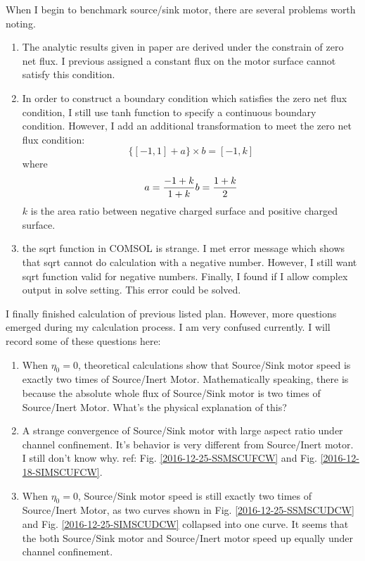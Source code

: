 \documentclass[fontsize=11pt, %
                             paper=a4, %
                             twoside, %
                             captions=tableheading,
                             index=totoc,
                             hyperref]{labbook}
\begin{document}
\begin{addmargin}[4cm]{0cm}
When I begin to benchmark source/sink motor, there are several problems worth noting.
\begin{enumerate}
\item
The analytic results given in paper\cite{Nourhani2016} are derived under the constrain of zero net flux. I previous assigned a constant flux on the motor surface cannot satisfy this condition.
\item
In order to construct a boundary condition which satisfies the zero net flux condition, I still use tanh function to specify a continuous boundary condition. However, I add an additional transformation to meet the zero net flux condition:
\begin{equation}
\{[-1,1]+a\}\times b=[-1,k]
\end{equation}
where
\begin{equation}
a=\frac{-1+k}{1+k}\\
b=\frac{1+k}{2}
\end{equation}
$k$ is the area ratio between negative charged surface and positive charged surface.
\item
the sqrt function in COMSOL is strange. I met error message which shows that sqrt cannot do calculation with a negative number. However, I still want sqrt function valid for negative numbers. Finally, I found if I allow complex output in solve setting. This error could be solved.
\end{enumerate}
I finally finished calculation of previous listed plan. However, more questions emerged during my calculation process. I am very confused currently. I will record some of these questions here:
\begin{enumerate}
\item
When $\eta_0=0$, theoretical calculations show that Source/Sink motor speed is exactly two times of Source/Inert Motor. Mathematically speaking, there is because the absolute whole flux of Source/Sink motor is two times of Source/Inert Motor. What's the physical explanation of this?
\item
A strange convergence of Source/Sink motor with large aspect ratio under channel confinement. It's behavior is very different from Source/Inert motor. I still don't know why. ref: Fig. \ref{2016-12-25-SSMSCUFCW} and Fig. \ref{2016-12-18-SIMSCUFCW}.
\item
When $\eta_0=0$, Source/Sink motor speed is still exactly two times of Source/Inert Motor, as two curves shown in Fig. \ref{2016-12-25-SSMSCUDCW} and Fig. \ref{2016-12-25-SIMSCUDCW} collapsed into one curve. It seems that the both Source/Sink motor and Source/Inert motor speed up equally under channel confinement.

\end{enumerate}
\end{addmargin}
\end{document}
